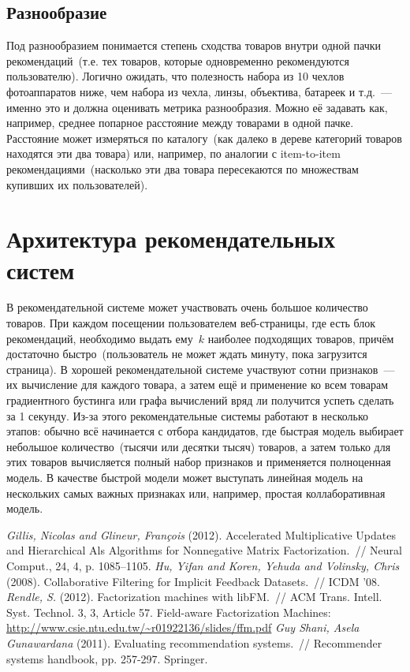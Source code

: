 \documentclass[12pt,fleqn]{article}
\begin{document}
\subsection{Разнообразие}


Под разнообразием понимается степень сходства товаров внутри одной пачки рекомендаций~(т.е. тех товаров,
которые одновременно рекомендуются пользователю).
Логично ожидать, что полезность набора из 10 чехлов фотоаппаратов ниже,
чем набора из чехла, линзы, объектива, батареек и т.д.~--- именно это и должна оценивать метрика разнообразия.
Можно её задавать как, например, среднее попарное расстояние между товарами в одной пачке.
Расстояние может измеряться по каталогу~(как далеко в дереве категорий товаров находятся эти два товара) или, например,
по аналогии с item-to-item рекомендациями~(насколько эти два товара пересекаются по множествам купивших их пользователей).

\section{Архитектура рекомендательных систем}

В рекомендательной системе может участвовать очень большое количество товаров.
При каждом посещении пользователем веб-страницы, где есть блок рекомендаций,
необходимо выдать ему~$k$ наиболее подходящих товаров, причём достаточно быстро~(пользователь не может
ждать минуту, пока загрузится страница).
В хорошей рекомендательной системе участвуют сотни признаков~--- их вычисление для каждого товара,
а затем ещё и применение ко всем товарам градиентного бустинга или графа вычислений вряд ли
получится успеть сделать за 1 секунду.
Из-за этого рекомендательные системы работают в несколько этапов: обычно всё начинается с отбора кандидатов,
где быстрая модель выбирает небольшое количество~(тысячи или десятки тысяч) товаров,
а затем только для этих товаров вычисляется полный набор признаков и применяется полноценная модель.
В качестве быстрой модели может выступать линейная модель на нескольких самых важных признаках или, например,
простая коллаборативная модель.


\begin{thebibliography}{1}
    \emph{Gillis, Nicolas and Glineur, Fran\c{c}ois} (2012).
    Accelerated Multiplicative Updates and Hierarchical Als Algorithms for Nonnegative Matrix Factorization.~//
    Neural Comput., 24, 4, p. 1085--1105.
    \emph{Hu, Yifan and Koren, Yehuda and Volinsky, Chris} (2008).
    Collaborative Filtering for Implicit Feedback Datasets.~//
    ICDM '08.
    \emph{Rendle, S.} (2012).
    Factorization machines with libFM.~//
    ACM Trans. Intell. Syst. Technol. 3, 3, Article 57.
    Field-aware Factorization Machines: \\\url{http://www.csie.ntu.edu.tw/\~r01922136/slides/ffm.pdf}
    \emph{Guy Shani, Asela Gunawardana} (2011).
    Evaluating recommendation systems.~//
    Recommender systems handbook, pp. 257-297. Springer.
\end{thebibliography}
\end{document}
